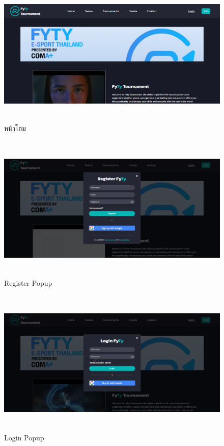     \begin{figure}[ht]
      \begin{center}
      \includegraphics[width=18cm,height=7cm,keepaspectratio]{home_no_login.png}
      \end{center}
      \caption[หน้าโฮม]{หน้าโฮม}
      \label{fig:หน้าโฮม}
    \end{figure}
    \begin{figure}[ht]
      \begin{center}
        \includegraphics[width=18cm,height=7cm,keepaspectratio]{register.png}
      \end{center}
      \caption[Register Popup]{Register Popup}
      \label{fig:Register Popup}
    \end{figure}
    \begin{figure}[ht]
      \begin{center}
        \includegraphics[width=18cm,height=7cm,keepaspectratio]{login.png}
      \end{center}
      \caption[Login Popup]{Login Popup}
      \label{fig:Login Popup}
    \end{figure}

